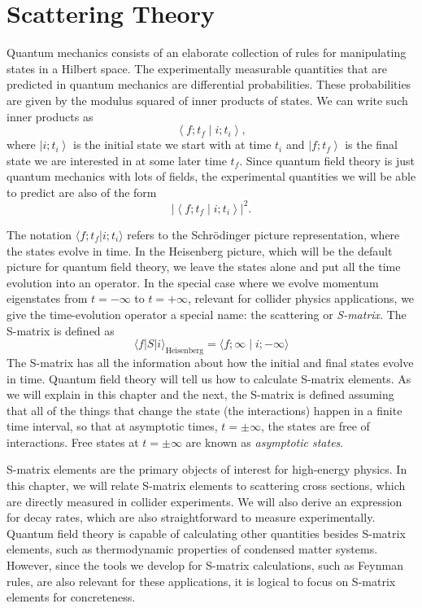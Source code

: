 \section{Scattering Theory}
Quantum mechanics consists of an elaborate collection of rules for manipulating states in a Hilbert space. The experimentally measurable quantities that are predicted in quantum mechanics are differential probabilities. 
These probabilities are given by the modulus squared of inner products of states. We can write such inner products as 
\begin{equation*}
	\left\langle f ; t_{f} \mid i ; t_{i}\right\rangle,
\end{equation*}
where $\left|i ; t_{i}\right\rangle$ is the initial state we start with at time $t_{i}$ and $\left| f ; t_{f}\right\rangle$ is the final state we are interested in at some later time $t_{f}$. 
Since quantum field theory is just quantum mechanics with lots of fields, the experimental quantities we will be able to predict are also of the form 
\begin{equation*}
	\left|\left\langle f ; t_{f} \mid i ; t_{i}\right\rangle\right|^{2}.
\end{equation*}

The notation $\langle f;t_f|i;t_i\rangle$ refers to the Schr{\"o}dinger picture representation, where the states evolve in time. 
In the Heisenberg picture, which will be the default picture for quantum field theory, we leave the states alone and put all the time evolution into an operator. 
In the special case where we evolve momentum eigenstates from $t=-\infty$ to $t=+\infty$, relevant for collider physics applications, we give the time-evolution operator a special name: the scattering or \textit{S-matrix}. The S-matrix is defined as
\begin{equation}
	\langle f|S| i\rangle_{\text{Heisenberg}}
	= \langle f ; \infty \mid i ;-\infty\rangle
\end{equation}
The S-matrix has all the information about how the initial and final states evolve in time. Quantum field theory will tell us how to calculate S-matrix elements. 
As we will explain in this chapter and the next, the S-matrix is defined assuming that all of the things that change the state (the interactions) happen in a finite time interval, so that at asymptotic times, $t=\pm \infty$, the states are free of interactions. 
Free states at $t=\pm \infty$ are known as \textit{asymptotic states}.

S-matrix elements are the primary objects of interest for high-energy physics. 
In this chapter, we will relate S-matrix elements to scattering cross sections, which are directly measured in collider experiments. 
We will also derive an expression for decay rates, which are also straightforward to measure experimentally. 
Quantum field theory is capable of calculating other quantities besides S-matrix elements, such as thermodynamic properties of condensed matter systems. 
However, since the tools we develop for S-matrix calculations, such as Feynman rules, are also relevant for these applications, it is logical to focus on S-matrix elements for concreteness.



